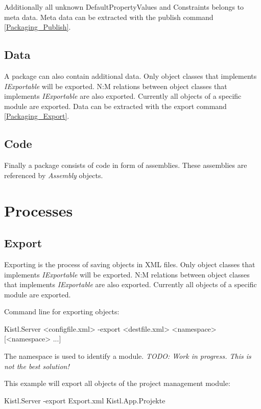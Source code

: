 Additionally all unknown DefaultPropertyValues and Constraints belongs to meta data.
Meta data can be extracted with the publish command \ref{Packaging_Publish}.

\subsection{\label{Packaging_Data}Data}

A package can also contain additional data. Only object classes that implements \emph{IExportable} will be exported. 
N:M relations between object classes that implements \emph{IExportable} are also exported. 
Currently all objects of a specific module are exported.
Data can be extracted with the export command \ref{Packaging_Export}.

\subsection{\label{Packaging_Code}Code}

Finally a package consists of code in form of assemblies. These assemblies are referenced by \emph{Assembly} objects.

\section{\label{Packaging_Processes}Processes}

\subsection{\label{Packaging_Export}Export}

Exporting is the process of saving objects in XML files. Only object classes that implements \emph{IExportable} will be exported. 
N:M relations between object classes that implements \emph{IExportable} are also exported. 
Currently all objects of a specific module are exported.

Command line for exporting objects:
\begin{CS}
Kistl.Server <configfile.xml> -export <destfile.xml> <namespace> [<namespace> ...]
\end{CS}

The namespace is used to identify a module. \emph{TODO: Work in progress. This is not the best solution!}
\par

This example will export all objects of the project management module:
\begin{CS}
Kistl.Server -export Export.xml Kistl.App.Projekte
\end{CS}

